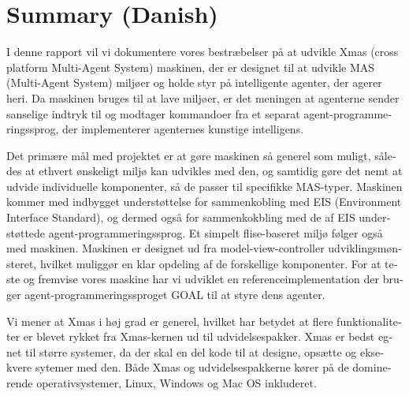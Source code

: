 \chapter{Summary (Danish)}
\begin{otherlanguage}{danish}

I denne rapport vil vi dokumentere vores bestræbelser på at udvikle Xmas (cross platform Multi-Agent System) maskinen, der er designet til at udvikle MAS (Multi-Agent System) miljøer og holde styr på intelligente agenter, der agerer heri. Da maskinen bruges til at lave miljøer, er det meningen at agenterne sender sanselige indtryk til og modtager kommandoer fra et separat agent-programmeringssprog, der implementerer agenternes kunstige intelligens.

Det primære mål med projektet er at gøre maskinen så generel som muligt, således at ethvert ønskeligt miljø kan udvikles med den, og samtidig gøre det nemt at udvide individuelle komponenter, så de passer til specifikke MAS-typer. Maskinen kommer med indbygget understøttelse for sammenkobling med EIS (Environment Interface Standard), og dermed også for sammenkokbling med de af EIS understøttede agent-programmeringssprog. Et simpelt flise-baseret miljø følger også med maskinen. Maskinen er designet ud fra model-view-controller udviklingsmønsteret, hvilket muliggør en klar opdeling af de forskellige komponenter. For at teste og fremvise vores maskine har vi udviklet en referenceimplementation der bruger agent-programmeringssproget GOAL til at styre dens agenter. 

Vi mener at Xmas i høj grad er generel, hvilket har betydet at flere funktionaliteter er blevet rykket fra Xmas-kernen ud til udvidelsespakker. Xmas er bedst egnet til større systemer, da der skal en del kode til at designe, opsætte og eksekvere sytemer med den. Både Xmas og udvidelsespakkerne kører på de dominerende operativsystemer, Linux, Windows og Mac OS inkluderet.

\end{otherlanguage}